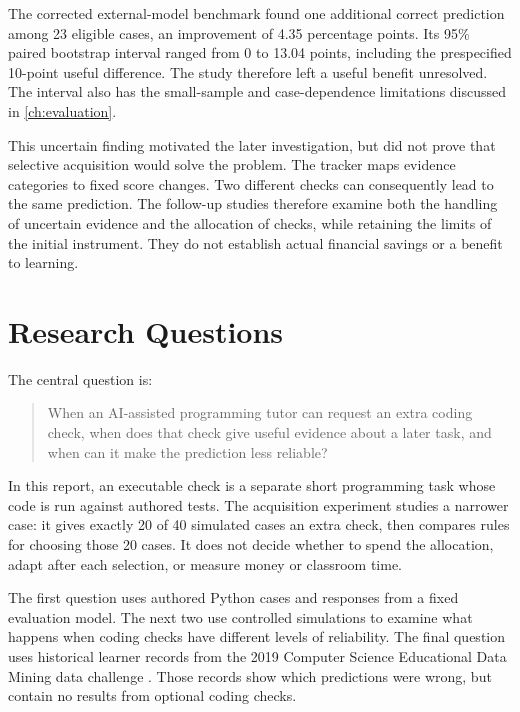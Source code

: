 The corrected external-model benchmark found one additional correct prediction among 23 eligible cases, an improvement of
4.35 percentage points. Its 95\% paired bootstrap interval ranged from 0 to 13.04 points, including the prespecified
10-point useful difference. The study therefore left a useful benefit unresolved. The interval also has the small-sample and
case-dependence limitations discussed in \cref{ch:evaluation}.

This uncertain finding motivated the later investigation, but did not prove that selective acquisition would solve the problem. The
tracker maps evidence categories to fixed score changes. Two different checks can consequently lead to the same prediction.
The follow-up studies therefore examine both the handling of uncertain evidence and the allocation of checks, while retaining
the limits of the initial instrument. They do not establish actual financial savings or a benefit to learning.

\section{Research Questions}

The central question is:

\begin{quote}
When an AI-assisted programming tutor can request an extra coding check, when does that check give useful evidence about a later task, and
when can it make the prediction less reliable?
\end{quote}

In this report, an executable check is a separate short programming task whose code is run against authored tests. The
acquisition experiment studies a narrower case: it gives exactly 20 of 40 simulated cases an extra check, then compares rules
for choosing those 20 cases. It does not decide whether to spend the allocation, adapt after each selection, or measure money
or classroom time.

The first question uses authored Python cases and responses from a fixed evaluation model. The next two use controlled
simulations to examine what happens when coding checks have different levels of reliability. The final question uses
historical learner records from the 2019 Computer Science Educational Data Mining data challenge
\parencite{csedm2019challenge}. Those records show which predictions were wrong, but contain no results from optional
coding checks.

